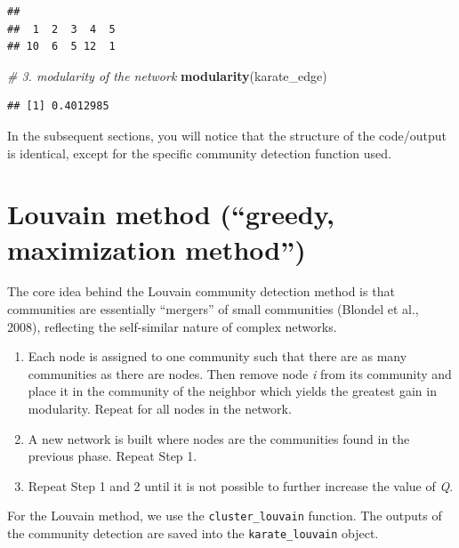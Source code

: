 \documentclass[
]{book}
\newenvironment{Shaded}{\begin{snugshade}}{\end{snugshade}}
\newcommand{\CommentTok}[1]{\textcolor[rgb]{0.56,0.35,0.01}{\textit{#1}}}
\newcommand{\FunctionTok}[1]{\textcolor[rgb]{0.13,0.29,0.53}{\textbf{#1}}}
\newcommand{\NormalTok}[1]{#1}
\begin{document}
\begin{verbatim}
## 
##  1  2  3  4  5 
## 10  6  5 12  1
\end{verbatim}

\begin{Shaded}
\begin{Highlighting}[]
\CommentTok{\# 3. modularity of the network }
\FunctionTok{modularity}\NormalTok{(karate\_edge)  }
\end{Highlighting}
\end{Shaded}

\begin{verbatim}
## [1] 0.4012985
\end{verbatim}

In the subsequent sections, you will notice that the structure of the code/output is identical, except for the specific community detection function used.

\section{Louvain method (``greedy, maximization method'')}\label{louvain-method-greedy-maximization-method}

The core idea behind the Louvain community detection method is that communities are essentially ``mergers'' of small communities (Blondel et al., 2008), reflecting the self-similar nature of complex networks.

\begin{enumerate}
\def\labelenumi{\arabic{enumi}.}
\item
  Each node is assigned to one community such that there are as many communities as there are nodes. Then remove node \emph{i} from its community and place it in the community of the neighbor which yields the greatest gain in modularity. Repeat for all nodes in the network.
\item
  A new network is built where nodes are the communities found in the previous phase. Repeat Step 1.
\item
  Repeat Step 1 and 2 until it is not possible to further increase the value of \emph{Q}.
\end{enumerate}

For the Louvain method, we use the \texttt{cluster\_louvain} function. The outputs of the community detection are saved into the \texttt{karate\_louvain} object.
\end{document}
